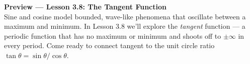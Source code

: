\documentclass[10pt]{article}
\begin{document}
\vspace{0.08in}

\begin{tcolorbox}[colback=navylight, colframe=navy, arc=2mm,
    left=3mm, right=3mm, top=2mm, bottom=2mm]
\small\textbf{Preview --- Lesson 3.8: The Tangent Function}\\
Sine and cosine model bounded, wave-like phenomena that oscillate between a
maximum and minimum. In Lesson 3.8 we'll explore the \emph{tangent} function ---
a periodic function that has no maximum or minimum and shoots off to $\pm\infty$
in every period. Come ready to connect tangent to the unit circle ratio
$\tan\theta = \sin\theta / \cos\theta$.
\end{tcolorbox}
\end{document}
